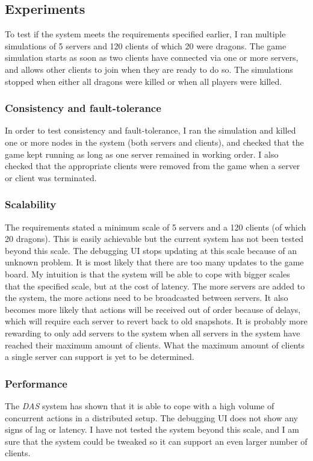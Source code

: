 \documentclass{article}
\begin{document}
\subsection{Experiments}

To test if the system meets the requirements specified earlier, I ran multiple simulations of 5 servers and 120 clients of which 20 were dragons. The game simulation starts as soon as two clients have connected via one or more servers, and allows other clients to join when they are ready to do so. The simulations stopped when either all dragons were killed or when all players were killed.

\subsubsection{Consistency and fault-tolerance}
In order to test consistency and fault-tolerance, I ran the simulation and killed one or more nodes in the system (both servers and clients), and checked that the game kept running as long as one server remained in working order. I also checked that the appropriate clients were removed from the game when a server or client was terminated. 

\subsubsection{Scalability}
The requirements stated a minimum scale of 5 servers and a 120 clients (of which 20 dragons). This is easily achievable but the current system has not been tested beyond this scale. The debugging UI stops updating at this scale because of an unknown problem. It is most likely that there are too many updates to the game board. My intuition is that the system will be able to cope with bigger scales that the specified scale, but at the cost of latency. The more servers are added to the system, the more actions need to be broadcasted between servers. It also becomes more likely that actions will be received out of order because of delays, which will require each server to revert back to old snapshots. It is probably more rewarding to only add servers to the system when all servers in the system have reached their maximum amount of clients. What the maximum amount of clients a single server can support is yet to be determined.

\subsubsection{Performance}
The \textit{DAS} system has shown that it is able to cope with a high volume of concurrent actions in a distributed setup. The debugging UI does not show any signs of lag or latency. I have not tested the system beyond this scale, and I am sure that the system could be tweaked so it can support an even larger number of clients.
\end{document}
